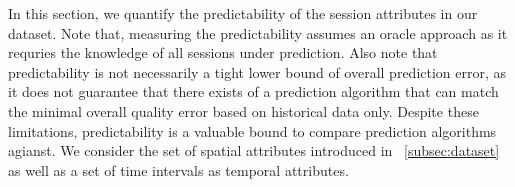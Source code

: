 \begin{figure}[t!]
\centering
{}
\label{fig:predictability}
\end{figure}



In this section, we quantify the predictability of the session attributes in our dataset. Note that, measuring the predictability assumes an oracle approach as it requries the knowledge of all sessions under prediction. Also note that predictability is not necessarily a tight lower bound of overall prediction error, as it does not guarantee that there exists of a prediction algorithm that can match the minimal overall quality error based on historical data only. Despite these limitations, predictability is a valuable bound to compare prediction algorithms agianst. We consider the set of spatial attributes introduced in \Section~\ref{subsec:dataset} as well as a set of time intervals as temporal attributes.


